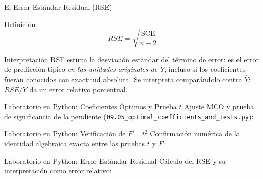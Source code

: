 \documentclass[10pt, aspectratio=169]{beamer}
\begin{document}
\begin{frame}{El Error Estándar Residual (RSE)}
  \footnotesize
  \begin{block}{Definición}
    $$RSE=\sqrt{\frac{\text{SCE}}{n-2}}$$
  \end{block}
  \pause

  \vspace{0.1cm}
  \begin{alertblock}{Interpretación}
    RSE estima la desviación estándar del término de error: es el error de predicción típico \emph{en las unidades originales de $Y$}, incluso si los coeficientes fueran conocidos con exactitud absoluta. Se interpreta comparándolo contra $\bar Y$: $RSE/\bar Y$ da un error relativo porcentual.
  \end{alertblock}
\end{frame}

\begin{frame}[fragile]{Laboratorio en Python: Coeficientes Óptimos y Prueba $t$}
  \scriptsize
  Ajuste MCO y prueba de significancia de la pendiente (\texttt{09.05\_optimal\_coefficients\_and\_tests.py}):
  {
  }
\end{frame}

\begin{frame}[fragile]{Laboratorio en Python: Verificación de $F=t^2$}
  \scriptsize
  Confirmación numérica de la identidad algebraica exacta entre las pruebas $t$ y $F$:
  {
  }
\end{frame}

\begin{frame}[fragile]{Laboratorio en Python: Error Estándar Residual}
  \scriptsize
  Cálculo del RSE y su interpretación como error relativo:
  {
  }
\end{frame}
\end{document}
